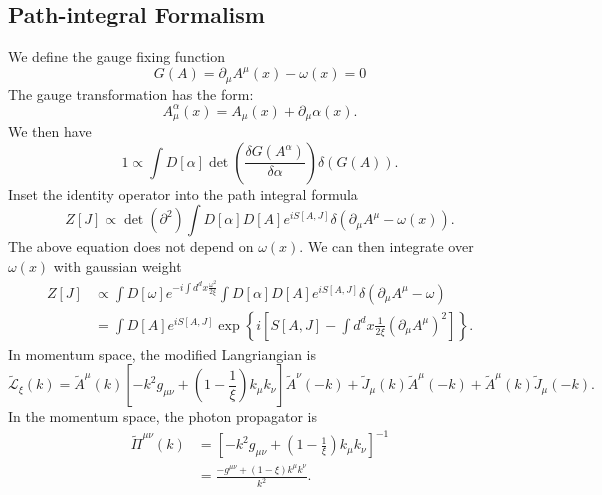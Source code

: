\subsection{Path-integral Formalism}
We define the gauge fixing function
\begin{equation*}
	G(A) = \partial_\mu A^\mu(x) -\omega(x) = 0
\end{equation*}
The gauge transformation has the form:
\begin{equation*}
	A^\alpha_\mu(x) = A_\mu(x) + \partial_\mu \alpha(x).
\end{equation*}
We then have
\begin{equation*}
	1 \propto \int D[\alpha] \det\left(\frac{\delta G(A^\alpha)}{\delta \alpha}\right) \delta(G(A)).
\end{equation*}
Inset the identity operator into the path integral formula
\begin{equation*}
	Z[J] \propto \det\left(\partial^2 \right) \int D[\alpha]D[A] e^{iS[A,J]} \delta(\partial_\mu A^\mu -\omega(x)).
\end{equation*}
The above equation does not depend on $\omega(x)$.
We can then integrate over $\omega(x)$ with gaussian weight
\begin{equation*}
\begin{aligned}
	Z[J] &\propto \int D[\omega] e^{-i\int d^d x \frac{\omega^2}{2\xi}} \int D[\alpha]D[A] e^{iS[A,J]}
	\delta(\partial_\mu A^\mu-\omega) \\
	&= \int D[A] e^{iS[A,J]} \exp\left\{i \left[S[A,J]-\int d^d x \frac{1}{2\xi}(\partial_\mu A^\mu)^2 \right]\right\}.
\end{aligned}
\end{equation*}
In momentum space, the modified Langriangian is 
\begin{equation*}
	\tilde{\mathcal{L}}_\xi(k) = \tilde{A}^\mu(k)\left[
		-k^2 g_{\mu\nu}+\left(1-\frac{1}{\xi}\right)k_\mu k_\nu
		\right] \tilde{A}^\nu(-k) +
		\tilde{J}_\mu(k) \tilde{A}^\mu(-k) +
		\tilde{A}^\mu(k) \tilde{J}_\mu(-k).
\end{equation*}
In the momentum space, the photon propagator is
\begin{equation}\label{eq:qft-photon-momentum-propagator}
\begin{aligned}
	\tilde\Pi^{\mu\nu}(k) 
	&= \left[-k^2 g_{\mu\nu}+\left(1-\frac{1}{\xi}\right)k_\mu k_\nu\right]^{-1} \\
	&= \frac{-g^{\mu\nu}+(1-\xi)k^\mu k^\nu}{k^2}.
\end{aligned}
\end{equation}
